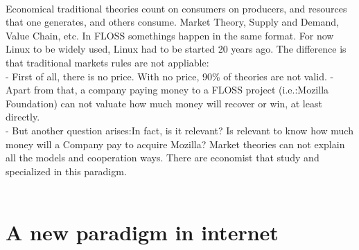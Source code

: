 \\
Economical traditional theories count on consumers on producers, and resources that one generates, and others consume. Market Theory, Supply and Demand, Value Chain, etc. In FLOSS somethings happen in the same format. For now Linux to be widely used, Linux had to be started 20 years ago. The difference is that traditional markets rules are not appliable:\\
- First of all, there is no price. With no price, 90\% of theories are not valid. 
- Apart from that, a company paying money to a FLOSS project (i.e.:Mozilla Foundation) can not valuate how much money will recover or win, at least directly.\\ 
- But another question arises:In fact, is it relevant? Is relevant to know how much money will a Company pay to acquire Mozilla? Market theories can not explain all the models and cooperation ways. There are economist that study and specialized in this paradigm.\\
\\

\section{A new paradigm in internet}\label{MARKET_FLOSS} 

